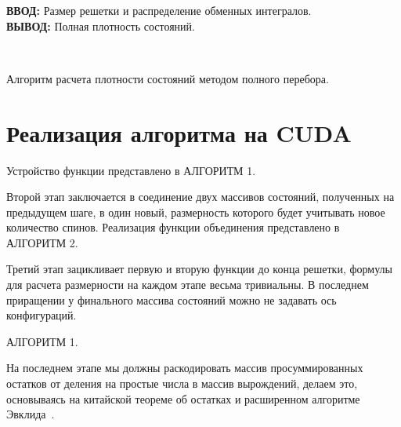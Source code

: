 \documentclass[10pt]{article}
\begin{document}
	\begin{algorithm}[H]
		\textbf{ВВОД:} Размер решетки и распределение обменных интегралов.\\
		\textbf{ВЫВОД:} Полная плотность состояний.
		\begin{algorithmic}
			{
				{
					{
					}
					\ENDFOR\\
				}
				\ENDFOR
			}
			\ENDFOR
		\end{algorithmic}
		\caption{Алгоритм расчета плотности состояний методом полного перебора.}
		\label{algo:dos_exhaustive}
	\end{algorithm}
	
	
	
	
	\section{Реализация алгоритма на CUDA}
	Устройство функции представлено в АЛГОРИТМ 1.
	
	Второй этап заключается в соединение двух массивов состояний, полученных на предыдущем шаге, в один новый, размерность которого будет учитывать новое количество спинов.  Реализация функции объединения представлено в АЛГОРИТМ 2.
	
	Третий этап зацикливает первую и вторую функции до конца решетки, формулы для расчета размерности на каждом этапе весьма тривиальны. В последнем приращении у финального массива состояний можно не задавать ось конфигураций.
	
	АЛГОРИТМ 1.
	
	На последнем этапе мы должны раскодировать массив просуммированных остатков от деления на простые числа в массив вырождений, делаем это, основываясь на китайской теореме об остатках и расширенном алгоритме Эвклида~\cite{katz2007mathematics}.
	
\end{document}
